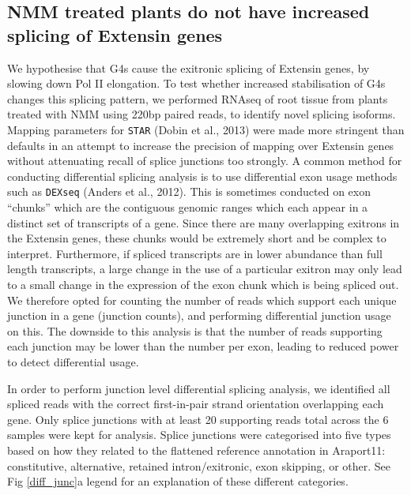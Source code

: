 \documentclass[12pt,a4paper,]{report}
\begin{document}
\newpage

\hypertarget{nmm-treated-plants-do-not-have-increased-splicing-of-extensin-genes}{%
\subsection{NMM treated plants do not have increased splicing of
Extensin
genes}\label{nmm-treated-plants-do-not-have-increased-splicing-of-extensin-genes}}

\label{ssec:extensin_nmm_splice}

We hypothesise that G4s cause the exitronic splicing of Extensin genes,
by slowing down Pol II elongation. To test whether increased
stabilisation of G4s changes this splicing pattern, we performed RNAseq
of root tissue from plants treated with NMM using 220bp paired reads, to
identify novel splicing isoforms. Mapping parameters for \texttt{STAR}
(Dobin et al., 2013) were made more stringent than defaults in an
attempt to increase the precision of mapping over Extensin genes without
attenuating recall of splice junctions too strongly. A common method for
conducting differential splicing analysis is to use differential exon
usage methods such as \texttt{DEXseq} (Anders et al., 2012). This is
sometimes conducted on exon ``chunks'' which are the contiguous genomic
ranges which each appear in a distinct set of transcripts of a gene.
Since there are many overlapping exitrons in the Extensin genes, these
chunks would be extremely short and be complex to interpret.
Furthermore, if spliced transcripts are in lower abundance than full
length transcripts, a large change in the use of a particular exitron
may only lead to a small change in the expression of the exon chunk
which is being spliced out. We therefore opted for counting the number
of reads which support each unique junction in a gene (junction counts),
and performing differential junction usage on this. The downside to this
analysis is that the number of reads supporting each junction may be
lower than the number per exon, leading to reduced power to detect
differential usage.

In order to perform junction level differential splicing analysis, we
identified all spliced reads with the correct first-in-pair strand
orientation overlapping each gene. Only splice junctions with at least
20 supporting reads total across the 6 samples were kept for analysis.
Splice junctions were categorised into five types based on how they
related to the flattened reference annotation in Araport11:
constitutive, alternative, retained intron/exitronic, exon skipping, or
other. See Fig \ref{diff_junc}a legend for an explanation of these
different categories.
\end{document}
